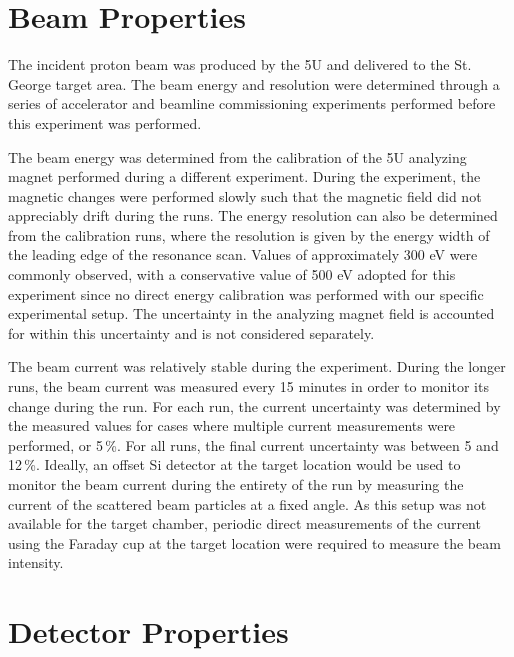 \section{Beam Properties}
\label{sec:beam-properties}

The incident proton beam was produced by the 5U and delivered to the St.
George target area. The beam energy and resolution were determined
through a series of accelerator and beamline commissioning experiments
performed before this experiment was performed.


The beam energy was determined from the calibration of the 5U analyzing
magnet performed during a different experiment. During the experiment,
the magnetic changes were performed slowly such that the magnetic field
did not appreciably drift during the runs. The energy resolution can
also be determined from the calibration runs, where the resolution is
given by the energy width of the leading edge of the resonance scan.
Values of approximately 300 eV were commonly observed, with a
conservative value of 500 eV adopted for this experiment since no direct
energy calibration was performed with our specific experimental setup.
The uncertainty in the analyzing magnet field is accounted for within
this uncertainty and is not considered separately.


The beam current was relatively stable during the experiment. During the
longer runs, the beam current was measured every 15 minutes in order to
monitor its change during the run. For each run, the current uncertainty
was determined by the measured values for cases where multiple current
measurements were performed, or 5\,\%. For all runs, the final current
uncertainty was between 5 and 12\,\%. Ideally, an offset Si detector at
the target location would be used to monitor the beam current during the
entirety of the run by measuring the current of the scattered beam
particles at a fixed angle. As this setup was not available for the
target chamber, periodic direct measurements of the current using the
Faraday cup at the target location were required to measure the beam
intensity.

\section{Detector Properties}
\label{sec:detector-properties}

